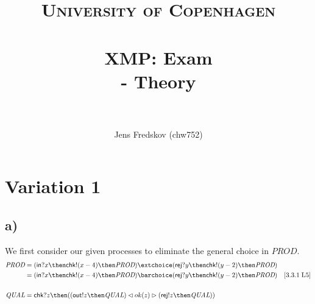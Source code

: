 \documentclass[a4paper, 11pt]{article}
\title{ 
\normalfont \normalsize 
\textsc{University of Copenhagen} \\ [25pt]
\horrule{0.5pt} \\[0.4cm]
\huge XMP: Exam \\ \Large - Theory \\
\horrule{2pt} \\[0.5cm]
}
\author{Jens Fredskov (chw752)}
\def\Prod{\textit{PROD}}
\def\Qual{\textit{QUAL}}
\def\inc{\textsf{in}}
\def\chk{\textsf{chk}}
\def\rej{\textsf{rej}}
\def\outc{\textsf{out}}
\newcommand{\law}[2]{[#1\;\text{#2}]}
\begin{document}
\maketitle
\pagebreak

\section{Variation 1} %
\label{sec:variation_1}

\subsection{a)} %

We first consider our given processes to eliminate the general choice in $\Prod$.
\begin{align*}
    \Prod
    &= (\inc ? x \then \chk ! (x-4) \then \Prod) \extchoice
       (\rej ? y \then \chk ! (y-2) \then \Prod) \\
    &= (\inc ? x \then \chk ! (x-4) \then \Prod) \barchoice
       (\rej ? y \then \chk ! (y-2) \then \Prod) & \law{3.3.1}{L5} \\ \\
    \Qual
    &= \chk ? z \then ((\outc ! z \then \Qual) \lhd ok(z) \rhd
                       (\rej ! z \then \Qual))
\end{align*}
\end{document}
